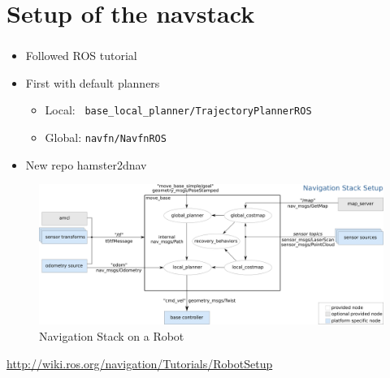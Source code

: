 \documentclass[numberofslides]{AMSBeamer}
\begin{document}

\section{Setup of the navstack}
\begin{frame}[label=navstack]
	\frametitle{\insertsectionhead}%
        \begin{itemize}
        \item Followed ROS tutorial
        \item First with default planners
            \begin{itemize}
                \item Local: \ \texttt{base\_local\_planner/TrajectoryPlannerROS}
                \item Global: \texttt{navfn/NavfnROS}
            \end{itemize}
        \item New repo hamster\textunderscore2dnav
    \end{itemize}
        \begin{center}
            \begin{figure}
                    \includegraphics[width=0.6\linewidth]{Presentations/LaTeX/images/nav_stack_tutorial.png}
                    \caption{Navigation Stack on a Robot}
                    \label{fig:nav_stack_tut}
            \end{figure}
            \tiny{\url{http://wiki.ros.org/navigation/Tutorials/RobotSetup}}
        \end{center}
        

\end{frame}
\end{document}
